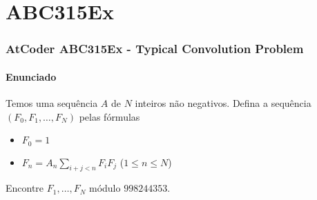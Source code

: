 \section{ABC315Ex} 
\begin{frame}[t]
     \frametitle{AtCoder ABC315Ex - Typical Convolution Problem} %
     \framesubtitle{Enunciado}
            Temos uma sequência $A$ de $N$ inteiros não negativos. Defina a sequência $(F_0, F_1, \dots, F_N)$ pelas fórmulas
            \begin{itemize}
            \item $F_0 = 1$
            \item $F_n = A_n \sum_{i+j<n}F_i F_j$ ($1 \leq n \leq N$)
            \end{itemize} 
            Encontre $F_1, \dots, F_N$ módulo $998244353$.
\end{frame}

